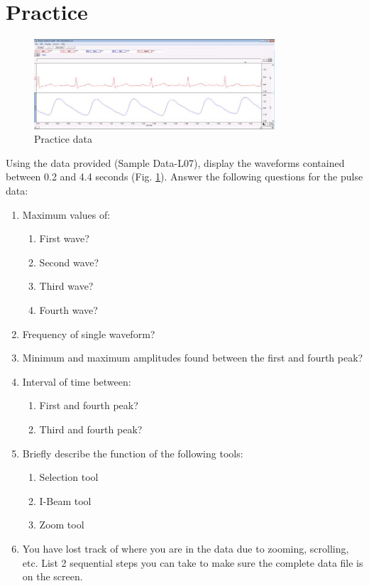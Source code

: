\documentclass{article}
\begin{document}
\section*{Practice}
	\begin{figure}[h]
		\includegraphics[width=0.8\textwidth]{../images/BIOPAC_15.jpg}
		\centering
		\caption{Practice data}
		\label{practice}
		\end{figure}
	
Using the data provided (Sample Data-L07), display the waveforms contained between 0.2 and 4.4 seconds (Fig. \ref{practice}). Answer the following questions for the pulse data:
		\begin{enumerate}
			\item Maximum values of:
				\begin{enumerate}
					\item First wave?
					\item Second wave?
					\item Third wave?
					\item Fourth wave?
				\end{enumerate}
			\item Frequency of single waveform?
			\item Minimum and maximum amplitudes found between the first and fourth peak?
			\item Interval of time between:
				\begin{enumerate}
					\item First and fourth peak?
					\item Third and fourth peak?
				\end{enumerate}
			\item Briefly describe the function of the following tools:
				\begin{enumerate}
					\item Selection tool
					\item I-Beam tool
					\item Zoom tool
				\end{enumerate}
			\item You have lost track of where you are in the data due to zooming, scrolling, etc. List 2 sequential steps you can take to make sure the complete data file is on the screen.
		\end{enumerate}
\end{document}
